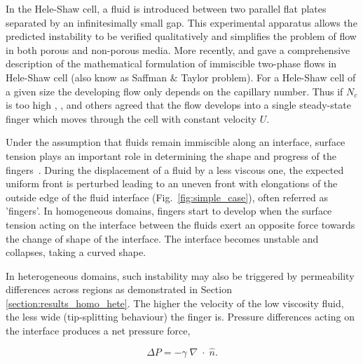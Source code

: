 \documentclass[preprint,authoryear,12pt]{elsarticle}
\begin{document}
\medskip
In the Hele-Shaw cell, a fluid is introduced between two parallel flat plates separated by an infinitesimally small gap. This experimental apparatus allows the predicted instability to be verified qualitatively and simplifies the problem of flow in both porous and non-porous media.   
More recently, \citet{howison_2000} and \citet{praud_2005} gave a comprehensive description of the mathematical formulation of immiscible two-phase flows in Hele-Shaw cell (also know as Saffman $\&$ Taylor problem). For a Hele-Shaw cell of a given size the developing flow only depends on the capillary number. Thus if \textit{$N_{c}$} is too high \citet{saffman_1959}, \citet{homsy_1987}, \citet{tabeling_1987} and others agreed that the flow develops into a single steady-state finger which moves through the cell with constant velocity $U$.

\medskip
 Under the assumption that fluids remain immiscible along an interface, surface tension plays an important role in determining the shape and progress of the fingers~\citep{howison_2000}. During the displacement of a fluid by a less viscous one, the expected uniform front is perturbed %
leading to an uneven front with elongations of the outside edge of the fluid interface (Fig.~\ref{fig:simple_case}), often referred as 'fingers'. In homogeneous domains, fingers start to develop when the surface tension acting on the interface between the fluids exert an opposite force towards the change of shape of the interface. The interface becomes unstable and collapses, taking a curved shape. 

\medskip 
In heterogeneous domains, such instability may also be triggered by permeability differences across regions as demonstrated in Section \ref{section:results_homo_hete}. The higher the velocity of the low viscosity fluid, the less wide (tip-splitting behaviour) the finger is. Pressure differences acting on the interface produces a net pressure force,      

\begin{equation} 
\Delta P= - \gamma \; \nabla \; \cdot \; \hat{n}. 
\label{eq:pressure_dif} 
\end{equation}
\end{document}
